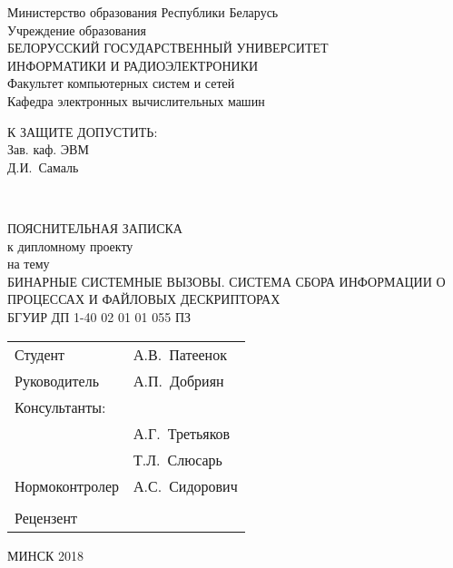 \begin{titlepage}
  \begin{center}
    Министерство образования Республики Беларусь\\[1em]
    Учреждение образования\\
    БЕЛОРУССКИЙ ГОСУДАРСТВЕННЫЙ УНИВЕРСИТЕТ \\
    ИНФОРМАТИКИ И РАДИОЭЛЕКТРОНИКИ\\[1em]

    Факультет компьютерных систем и сетей \\[0.6cm]

    Кафедра электронных вычислительных машин \\[1.4cm]

    \begin{flushright}
      \begin{minipage}{0.4\textwidth}
        \MakeUppercase{К защите допустить:}\\
        Зав. каф. ЭВМ\\
        \underline{\hspace*{2.8cm}} Д.И.~Самаль
      \end{minipage}\\[3.2em]
    \end{flushright}

    {ПОЯСНИТЕЛЬНАЯ ЗАПИСКА}\\
    {к дипломному проекту}\\
    {на тему}\\
    {\MakeUppercase{Бинарные системные вызовы. Система сбора информации о процессах и файловых дескрипторах}}\\[2em]


    {БГУИР ДП 1-40 02 01 01 055 ПЗ}\\[2em]

    \begin{tabular}{ p{}p{} }
      Студент & А.В.~Патеенок  \\[1em]

      Руководитель & А.П.~Добриян \\[1em]

      Консультанты: &\\[1em]

      \hspace*{6ex}{от кафедры ЭВМ} & А.Г.~Третьяков \\[1em]

      \hspace*{6ex}{по экономической части} & Т.Л.~Слюсарь \\[1em]

      Нормоконтролер & А.С.~Сидорович\\
      & \\
      Рецензент &
    \end{tabular}

    \vfill
    {\normalsize МИНСК 2018}
  \end{center}
\end{titlepage}

